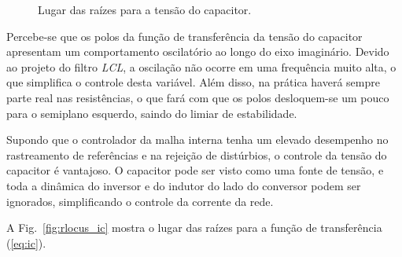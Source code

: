     \begin{figure}[htb]
        \renewcommand\figurename{Fig.}
        \caption{Lugar das raízes para a tensão do capacitor.}
        \label{fig:rlocus_vc}
    \end{figure}

    Percebe-se que os polos da função de transferência da tensão do capacitor
    apresentam um comportamento oscilatório ao longo do eixo imaginário. Devido
    ao projeto do filtro \emph{LCL}, a oscilação não ocorre em uma frequência
    muito alta, o que simplifica o controle desta variável. Além disso, na prática
    haverá sempre parte real nas resistências, o que fará com que os polos desloquem-se
    um pouco para o semiplano esquerdo, saindo do limiar de estabilidade.

    Supondo que o controlador da malha interna tenha um elevado desempenho
    no rastreamento de referências e na rejeição de distúrbios,
    o controle da tensão do capacitor é vantajoso. O capacitor
    pode ser visto como uma fonte de tensão, e toda a dinâmica
    do inversor e do indutor do lado do conversor podem ser ignorados,
    simplificando o controle da corrente da rede.

    A Fig.~\ref{fig:rlocus_ic} mostra o lugar das raízes para a função de
    transferência (\ref{eq:ic}).

